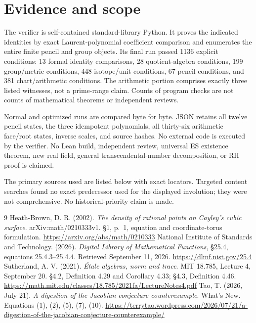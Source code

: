 \documentclass[11pt]{article}
\theoremstyle{remark}\newtheorem{remark}[theorem]{Remark}
\begin{document}
\section{Evidence and scope}
The verifier is self-contained standard-library Python. It proves the indicated identities by exact Laurent-polynomial coefficient comparison and enumerates the entire finite pencil and group objects. Its final run passed 1136 explicit conditions: 13 formal identity comparisons, 28 quotient-algebra conditions, 199 group/metric conditions, 448 isotope/unit conditions, 67 pencil conditions, and 381 chart/arithmetic conditions. The arithmetic portion comprises exactly three listed witnesses, not a prime-range claim. Counts of program checks are not counts of mathematical theorems or independent reviews.

Normal and optimized runs are compared byte for byte. JSON retains all twelve pencil states, the three idempotent polynomials, all thirty-six arithmetic face/root states, inverse scales, and source hashes. No external code is executed by the verifier. No Lean build, independent review, universal ES existence theorem, new real field, general transcendental-number decomposition, or RH proof is claimed.

The primary sources used are listed below with exact locators. Targeted content searches found no exact predecessor used for the displayed involution; they were not comprehensive. No historical-priority claim is made.

\begingroup\small\setlength{\bibsep}{3pt}
\begin{thebibliography}{9}
Heath-Brown, D. R. (2002). \emph{The density of rational points on Cayley's cubic surface}. arXiv:math/0210333v1. \S1, p.~1, equation and coordinate-torus formulation. \url{https://arxiv.org/abs/math/0210333}
National Institute of Standards and Technology. (2026). \emph{Digital Library of Mathematical Functions}, \S25.4, equations 25.4.3--25.4.4. Retrieved September 11, 2026. \url{https://dlmf.nist.gov/25.4}
Sutherland, A. V. (2021). \emph{\'Etale algebras, norm and trace}. MIT 18.785, Lecture 4, September 20. \S4.2, Definition 4.29 and Corollary 4.33; \S4.3, Definition 4.46. \url{https://math.mit.edu/classes/18.785/2021fa/LectureNotes4.pdf}
Tao, T. (2026, July 21). \emph{A digestion of the Jacobian conjecture counterexample}. What's New. Equations (1), (2), (5), (7), (10). \url{https://terrytao.wordpress.com/2026/07/21/a-digestion-of-the-jacobian-conjecture-counterexample/}
\end{thebibliography}
\endgroup
\end{document}
